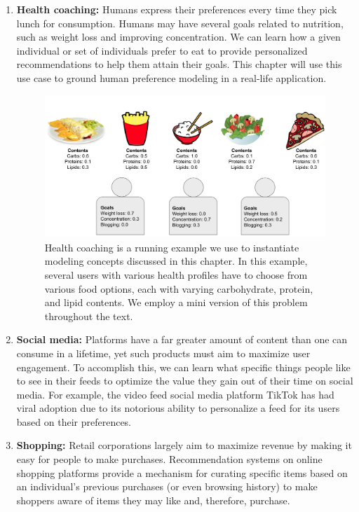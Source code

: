\documentclass[
  letterpaper,
  DIV=11,
  numbers=noendperiod,
  oneside]{scrreprt}
\theoremstyle{remark}
\DeclareRobustCommand{\href}[2]{#2\sidenote{\footnotesize \url{#1}}}
\begin{document}
\begin{enumerate}
\def\labelenumi{\arabic{enumi}.}
\item
  \textbf{Health coaching:} Humans express their preferences every time
  they pick lunch for consumption. Humans may have several goals related
  to nutrition, such as weight loss and improving concentration. We can
  learn how a given individual or set of individuals prefer to eat to
  provide personalized recommendations to help them attain their goals.
  This chapter will use this use case to ground human preference
  modeling in a real-life application.

  \begin{figure}[H]

  {\centering \includegraphics{Figures/health_coaching.png}

  }

  \caption{Health coaching is a running example we use to instantiate
  modeling concepts discussed in this chapter. In this example, several
  users with various health profiles have to choose from various food
  options, each with varying carbohydrate, protein, and lipid contents.
  We employ a mini version of this problem throughout the text.}

  \end{figure}%
\item
  \textbf{Social media:} Platforms have a far greater amount of content
  than one can consume in a lifetime, yet such products must aim to
  maximize user engagement. To accomplish this, we can learn what
  specific things people like to see in their feeds to optimize the
  value they gain out of their time on social media. For example, the
  video feed social media platform
  \href{https://www.tiktok.com/}{TikTok} has had viral adoption due to
  its notorious ability to personalize a feed for its users based on
  their preferences.
\item
  \textbf{Shopping:} Retail corporations largely aim to maximize revenue
  by making it easy for people to make purchases. Recommendation systems
  on online shopping platforms provide a mechanism for curating specific
  items based on an individual's previous purchases (or even browsing
  history) to make shoppers aware of items they may like and, therefore,
  purchase.
\end{enumerate}
\end{document}
